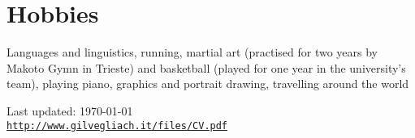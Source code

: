 \documentclass[letterpaper]{article}
\def\footerlink{http://www.gilvegliach.it/files/CV.pdf}
\begin{document}
\section*{Hobbies}
Languages and linguistics, running, martial art (practised for two years by Makoto Gymn in Trieste) and basketball (played for one year in the university's team), playing piano, graphics and portrait drawing, travelling around the world


\bigskip

\begin{center}
  \begin{footnotesize}
    Last updated: \today \\
    \href{\footerlink}{\texttt{\footerlink}}
  \end{footnotesize}
\end{center}
\end{document}
